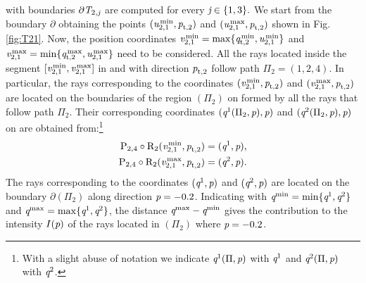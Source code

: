  with boundaries $\partial\mbox{$\emph{T}_{\textit{$2$,\textit{j}}}$}$ are computed for every $\textit{j}\in\{1,3\}.$
 We start from the boundary $\partial$ obtaining the points $(\textit{u}_{2, 1}^\textrm{\,min}, \textit{p}_{\textrm{t,} \textit{$2$}})$ and
 $(\textit{u}_{2, 1}^\textrm{\,max}, \textit{p}_{\textrm{t,} \textit{$2$}})$ shown in Fig. \ref{fig:T21}.
 Now, the position coordinates $\textit{v}_{2, 1}^\textrm{\,min} = \max\{\textit{q}_{\textrm{t,} \textit{$2$}}^ \textrm{\,min},\textit{u}_{2,1}^\textrm{\,min}\}$
 and $\textit{v}_{2, 1}^\textrm{\,max} = \min\{\textit{q}_{\textrm{t,} \textit{$2$}}^ \textrm{\,max},\textit{u}_{2, 1}^\textrm{\,max}\}$ need to be considered.
 All the rays located inside the segment $[\textit{v}_{2, 1}^\textrm{\,min},\textit{v}_{2, 1}^\textrm{\,max}]$ in
   and with direction $\textit{p}_{\textrm{t,} \textit{$2$}}$ follow path $\Pi_2 = (1,2,4)$. In particular, the rays corresponding to the coordinates $(\textit{v}_{2, 1}^\textrm{\,min},\textit{p}_{\textrm{t,} \textit{$2$}} )$ and $(\textit{v}_{2, 1}^\textrm{\,max},\textit{p}_{\textrm{t,} \textit{$2$}} )$ are  located on the boundaries of the region $(\Pi_2)$ on 
  formed by all the rays that follow path $\Pi_2$.
  Their corresponding coordinates $(\textit{q}^{1}(\Pi_2, \textit{p}), \textit{p})$ and
 $(\textit{q}^{2}(\Pi_2, \textit{p}), \textit{p})$ on  are obtained from:\footnote{With a slight abuse of notation we indicate  $\textit{q}^{1}(\Pi, \textit{p})$ with $\textit{q}^{1}$ and 
$ \textit{q}^{2}(\Pi, \textit{p})$ with $\textit{q}^{2}$.}
\begin{equation}
\begin{split}
\mathrm{P}_{2,4} \circ \mathrm{R}_{2} (\textit{v}_{2, 1}^\textrm{\,min},\textit{p}_{\textrm{t,} \textit{$2$}} ) & = (\textit{q}^{1}, \textit{p}), \\
\mathrm{P}_{2,4} \circ \mathrm{R}_{2} (\textit{v}_{2, 1}^\textrm{\,max},\textit{p}_{\textrm{t,} \textit{$2$}} ) & = (\textit{q}^{2}, \textit{p}).
\end{split}
\end{equation} 
The rays corresponding to the coordinates $(\textit{q}^{1}, \textit{p})$ and $(\textit{q}^{2}, \textit{p})$ are located
 on the boundary $\partial$$(\Pi_2)$ along direction $\textit{p}=-0.2$.
Indicating with $\textit{q}^{\textrm{min}} = \min\{\textit{q}^{1}, \textit{q}^2\}$ and $\textit{q}^{\textrm{max}} = \max\{\textit{q}^{1}, \textit{q}^2\}$, the distance $\textit{q}^{\textrm{max}}-\textit{q}^{\textrm{min}}$ gives the contribution to the intensity $I(\textit{p})$ of the rays located in $(\Pi_2)$ where $\textit{p}=-0.2$.\\
